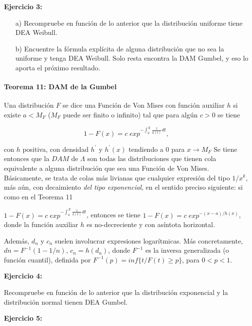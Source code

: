 \documentclass[
  oneside]{book}
\begin{document}
\textbf{Ejercicio 3:}

\begin{itemize}
\item[a)] Recompruebe en función de lo anterior que la distribución uniforme tiene DEA Weibull. 
\item[b)] Encuentre la fórmula explícita de alguna distribución que no sea la uniforme y tenga DEA Weibull.
Solo resta encontra la DAM Gumbel, y eso lo aporta el próximo resultado.
\end{itemize}

\hypertarget{teorema-11-dam-de-la-gumbel}{%
\paragraph{Teorema 11: DAM de la
Gumbel}\label{teorema-11-dam-de-la-gumbel}}

Una distribución \(F\) se dice una Función de Von Mises con función
auxiliar \(h\) si existe \(a < M_F\) (\(M_F\) puede ser finito o
infinito) tal que para algún \(c>0\) se tiene

\begin{equation}
1-F(x)= c\;exp^{{- \int_a^X \frac{1}{h(t)} dt}},
\end{equation}

con \(h\) positiva, con densidad \(h^\prime\) y \(h^\prime(x)\)
tendiendo a \(0\) para \(x\rightarrow M_F\) Se tiene entonces que la
\(DAM\) de \(\Lambda\) son todas las distribuciones que tienen cola
equivalente a alguna distribución que sea una Función de Von Mises.
Básicamente, se trata de colas más livianas que cualquier expresión del
tipo \(1/x^k\), más aún, con decaimiento \textit{del tipo exponencial},
en el sentido preciso siguiente: si como en el Teorema 11

\(1-F(x)= c\;exp^{{- \int_a^X \frac{1}{h(t)} dt}}\), entonces se tiene
\(1-F(x)= c\;exp^{-(x-a)/h(x)}\), donde la función auxiliar \(h\) es
no-decreciente y con asíntota horizontal.

Además, \(d_n\) y \(c_n\) suelen involucrar expresiones logarítmicas.
Más concretamente, \(dn = F^{-1}(1-1/n)\), \(c_n = h(d_n)\), donde
\(F^{-1}\) es la inversa generalizada (o función cuantil), definida por
\(F^{-1}(p)= inf\{t / F(t)\geq p\}\), para \(0<p<1\).

\textbf{Ejercicio 4:}

Recompruebe en función de lo anterior que la distribución exponencial y
la distribución normal tienen DEA Gumbel.

\textbf{Ejercicio 5:}
\end{document}
